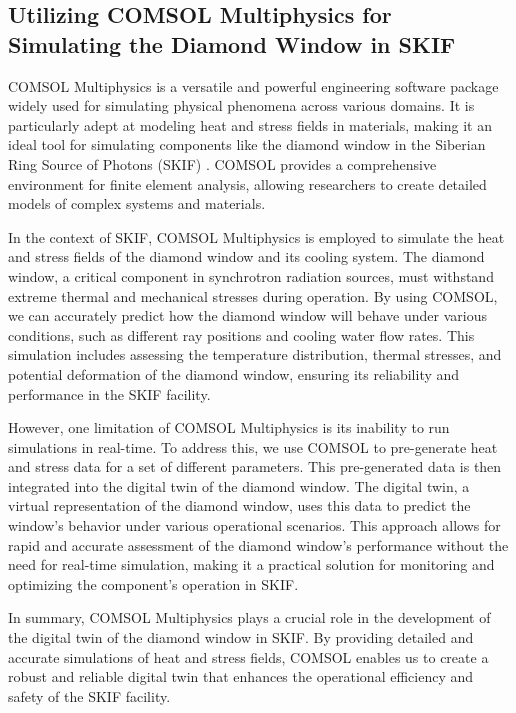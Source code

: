 \subsection{Utilizing COMSOL Multiphysics for Simulating the Diamond Window in
SKIF}

COMSOL Multiphysics is a versatile and powerful engineering software package
widely used for simulating physical phenomena across various domains. It is
particularly adept at modeling heat and stress fields in materials, making it
an ideal tool for simulating components like the diamond window in the Siberian
Ring Source of Photons (SKIF) \cite{Bachmann2017Numerical, Dudarev2021Study}.
COMSOL provides a comprehensive environment for finite element analysis,
allowing researchers to create detailed models of complex systems and
materials.

In the context of SKIF, COMSOL Multiphysics is employed to simulate the heat
and stress fields of the diamond window and its cooling system. The diamond
window, a critical component in synchrotron radiation sources, must withstand
extreme thermal and mechanical stresses during operation. By using COMSOL, we
can accurately predict how the diamond window will behave under various
conditions, such as different ray positions and cooling water flow rates. This
simulation includes assessing the temperature distribution, thermal stresses,
and potential deformation of the diamond window, ensuring its reliability and
performance in the SKIF facility.%

However, one limitation of COMSOL Multiphysics is its inability to run
simulations in real-time. To address this, we use COMSOL to pre-generate heat
and stress data for a set of different parameters. This pre-generated data is
then integrated into the digital twin of the diamond window. The digital twin,
a virtual representation of the diamond window, uses this data to predict the
window's behavior under various operational scenarios. This approach allows for
rapid and accurate assessment of the diamond window's performance without the
need for real-time simulation, making it a practical solution for monitoring
and optimizing the component's operation in SKIF.

In summary, COMSOL Multiphysics plays a crucial role in the development of the
digital twin of the diamond window in SKIF. By providing detailed and accurate
simulations of heat and stress fields, COMSOL enables us to create a robust and
reliable digital twin that enhances the operational efficiency and safety of
the SKIF facility.
